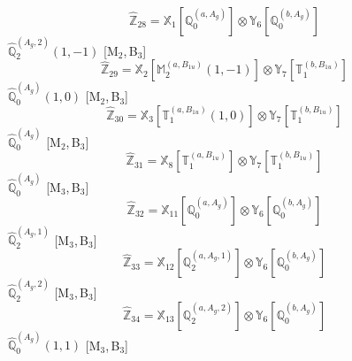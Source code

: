 \documentclass[fleqn,10pt,landscape]{article}
\begin{document}
\begin{itemize}
\begin{dmath*}
\hat{\mathbb{Z}}_{28}=\mathbb{X}_{1}[\mathbb{Q}_{0}^{(a,A_{g})}] \otimes\mathbb{Y}_{6}[\mathbb{Q}_{0}^{(b,A_{g})}]
\end{dmath*}
\vspace{4mm}
\noindent {} $\,\,\,\hat{\mathbb{Q}}_{2}^{(A_{g},2)}(1,-1)$ [M$_{2}$,\,B$_{3}$]
\begin{dmath*}
\hat{\mathbb{Z}}_{29}=\mathbb{X}_{2}[\mathbb{M}_{2}^{(a,B_{1u})}(1,-1)] \otimes\mathbb{Y}_{7}[\mathbb{T}_{1}^{(b,B_{1u})}]
\end{dmath*}
\vspace{4mm}
\noindent {} $\,\,\,\hat{\mathbb{Q}}_{0}^{(A_{g})}(1,0)$ [M$_{2}$,\,B$_{3}$]
\begin{dmath*}
\hat{\mathbb{Z}}_{30}=\mathbb{X}_{3}[\mathbb{T}_{1}^{(a,B_{1u})}(1,0)] \otimes\mathbb{Y}_{7}[\mathbb{T}_{1}^{(b,B_{1u})}]
\end{dmath*}
\vspace{4mm}
\noindent {} $\,\,\,\hat{\mathbb{Q}}_{0}^{(A_{g})}$ [M$_{2}$,\,B$_{3}$]
\begin{dmath*}
\hat{\mathbb{Z}}_{31}=\mathbb{X}_{8}[\mathbb{T}_{1}^{(a,B_{1u})}] \otimes\mathbb{Y}_{7}[\mathbb{T}_{1}^{(b,B_{1u})}]
\end{dmath*}
\vspace{4mm}
\noindent {} $\,\,\,\hat{\mathbb{Q}}_{0}^{(A_{g})}$ [M$_{3}$,\,B$_{3}$]
\begin{dmath*}
\hat{\mathbb{Z}}_{32}=\mathbb{X}_{11}[\mathbb{Q}_{0}^{(a,A_{g})}] \otimes\mathbb{Y}_{6}[\mathbb{Q}_{0}^{(b,A_{g})}]
\end{dmath*}
\vspace{4mm}
\noindent {} $\,\,\,\hat{\mathbb{Q}}_{2}^{(A_{g},1)}$ [M$_{3}$,\,B$_{3}$]
\begin{dmath*}
\hat{\mathbb{Z}}_{33}=\mathbb{X}_{12}[\mathbb{Q}_{2}^{(a,A_{g},1)}] \otimes\mathbb{Y}_{6}[\mathbb{Q}_{0}^{(b,A_{g})}]
\end{dmath*}
\vspace{4mm}
\noindent {} $\,\,\,\hat{\mathbb{Q}}_{2}^{(A_{g},2)}$ [M$_{3}$,\,B$_{3}$]
\begin{dmath*}
\hat{\mathbb{Z}}_{34}=\mathbb{X}_{13}[\mathbb{Q}_{2}^{(a,A_{g},2)}] \otimes\mathbb{Y}_{6}[\mathbb{Q}_{0}^{(b,A_{g})}]
\end{dmath*}
\vspace{4mm}
\noindent {} $\,\,\,\hat{\mathbb{Q}}_{0}^{(A_{g})}(1,1)$ [M$_{3}$,\,B$_{3}$]
\begin{dmath*}

\end{dmath*}
\end{itemize}
\end{document}
